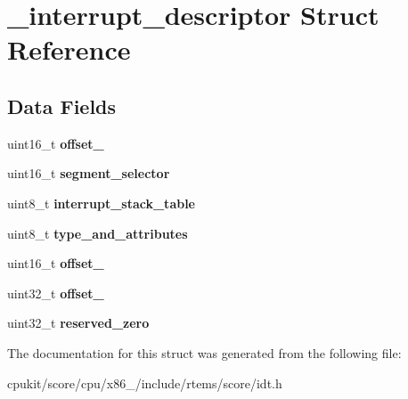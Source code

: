 \hypertarget{struct__interrupt__descriptor}{}\section{\+\_\+interrupt\+\_\+descriptor Struct Reference}
\label{struct__interrupt__descriptor}
\subsection*{Data Fields}
\begin{DoxyCompactItemize}
\item 
\mbox{\label{struct__interrupt__descriptor_af58f905ceeb29b84a6f0c764fc32456b}} 
uint16\+\_\+t {\bfseries offset\+\_}
\item 
\mbox{\label{struct__interrupt__descriptor_a97a030f7d40971b574ac7611e6644b3d}} 
uint16\+\_\+t {\bfseries segment\+\_\+selector}
\item 
\mbox{\label{struct__interrupt__descriptor_a5d1c8f2680e1539df65563c266519dbd}} 
uint8\+\_\+t {\bfseries interrupt\+\_\+stack\+\_\+table}
\item 
\mbox{\label{struct__interrupt__descriptor_a5084809a0e61121a5d3c215892d5f4c4}} 
uint8\+\_\+t {\bfseries type\+\_\+and\+\_\+attributes}
\item 
\mbox{\label{struct__interrupt__descriptor_a509ed030eea522b08259eebbc60eb787}} 
uint16\+\_\+t {\bfseries offset\+\_}
\item 
\mbox{\label{struct__interrupt__descriptor_a72bb19ba035ff324747e18eaedb301cb}} 
uint32\+\_\+t {\bfseries offset\+\_}
\item 
\mbox{\label{struct__interrupt__descriptor_afc53237dcbf1ea5a76fd947ae0a7ce78}} 
uint32\+\_\+t {\bfseries reserved\+\_\+zero}
\end{DoxyCompactItemize}


The documentation for this struct was generated from the following file\+:\begin{DoxyCompactItemize}
\item 
cpukit/score/cpu/x86\+\_/include/rtems/score/idt.\+h\end{DoxyCompactItemize}
